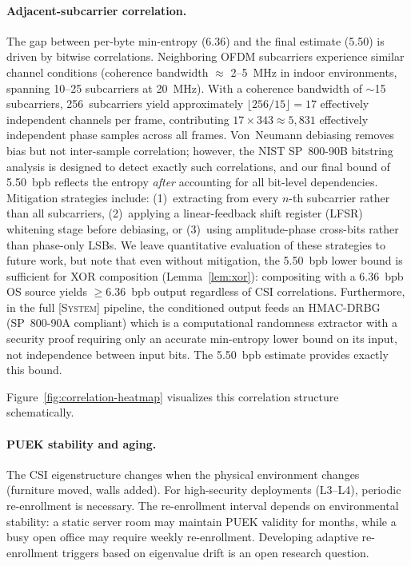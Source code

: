 \documentclass[sigconf,anonymous,review]{acmart}
\newcommand{\zipminator}{\textsc{[System]}\xspace}
\begin{document}
\paragraph{Adjacent-subcarrier correlation.}
The gap between per-byte min-entropy (6.36) and the final estimate (5.50) is driven by bitwise correlations.
Neighboring OFDM subcarriers experience similar channel conditions (coherence bandwidth $\approx$ 2--5~MHz in indoor environments, spanning 10--25 subcarriers at 20~MHz).
With a coherence bandwidth of $\sim$15 subcarriers, 256~subcarriers yield approximately $\lfloor 256/15 \rfloor = 17$ effectively independent channels per frame, contributing $17 \times 343 \approx 5{,}831$ effectively independent phase samples across all frames.
Von~Neumann debiasing removes bias but not inter-sample correlation; however, the NIST SP~800-90B bitstring analysis is designed to detect exactly such correlations, and our final bound of 5.50~bpb reflects the entropy \emph{after} accounting for all bit-level dependencies.
Mitigation strategies include: (1)~extracting from every $n$-th subcarrier rather than all subcarriers, (2)~applying a linear-feedback shift register (LFSR) whitening stage before debiasing, or (3)~using amplitude-phase cross-bits rather than phase-only LSBs.
We leave quantitative evaluation of these strategies to future work, but note that even without mitigation, the 5.50~bpb lower bound is sufficient for XOR composition (Lemma~\ref{lem:xor}): compositing with a 6.36~bpb OS source yields $\geq$6.36~bpb output regardless of CSI correlations.
Furthermore, in the full \zipminator pipeline, the conditioned output feeds an HMAC-DRBG (SP~800-90A compliant) which is a computational randomness extractor with a security proof requiring only an accurate min-entropy lower bound on its input, not independence between input bits.
The 5.50~bpb estimate provides exactly this bound.

Figure~\ref{fig:correlation-heatmap} visualizes this correlation structure schematically.



\paragraph{PUEK stability and aging.}
The CSI eigenstructure changes when the physical environment changes (furniture moved, walls added).
For high-security deployments (L3--L4), periodic re-enrollment is necessary.
The re-enrollment interval depends on environmental stability: a static server room may maintain PUEK validity for months, while a busy open office may require weekly re-enrollment.
Developing adaptive re-enrollment triggers based on eigenvalue drift is an open research question.
\end{document}
